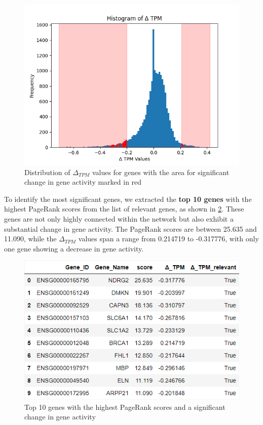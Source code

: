 \begin{figure}[!h]
    \centering
    \includegraphics[height=\dfheightdouble]{figures/04_delta_tpm_relevant}
    \caption{Distribution of $\Delta_{TPM}$ values for genes with the area for significant change in gene activity marked in red}
    \label{fig:04_delta_tpm_relevant}
\end{figure}


To identify the most significant genes, we extracted the \textbf{top 10 genes} with the highest PageRank scores from the list of relevant genes,
as shown in \cref{fig:03_03_df_pagerank_relevant}.
These genes are not only highly connected within the network but also exhibit a substantial change in gene activity.
The PageRank scores are between 25.635 and 11.090,
while the $\Delta_{TPM}$ values span a range from 0.214719 to -0.317776, with only one gene showing a decrease in gene activity.\\


\begin{figure}[!h]
    \centering
    \includegraphics[height=\dfheightdouble]{figures/03_03_df_pagerank_relevant}
    \caption{Top 10 genes with the highest PageRank scores and a significant change in gene activity}
    \label{fig:03_03_df_pagerank_relevant}
\end{figure}

